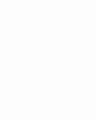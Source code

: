 \documentclass[11pt,fleqn,a4paper]{book} %
\begin{document}
  \begingroup
    \thispagestyle{empty}
    \AddToShipoutPicture*{\BackgroundPic} %
    \centering
    \vspace*{1cm}
    \par\normalfont\fontsize{35}{35}\sffamily\selectfont
    \textcolor{white}{MPM Theory Guide}\par %
    \vspace*{0.5cm}
    {\Large \textcolor{white}{Vaango version 16.02}}\par
    {\Large \textcolor{white}{February 2016}}\par
    \vspace*{1cm}
    {\Large \textcolor{white}{The Utah Uintah team}}\par %
    {\Large \textcolor{white}{and}}\par %
    {\Large \textcolor{white}{Biswajit Banerjee}}\par %
  \endgroup

  
  
  
  
  
  
  
  
  
\end{document}
